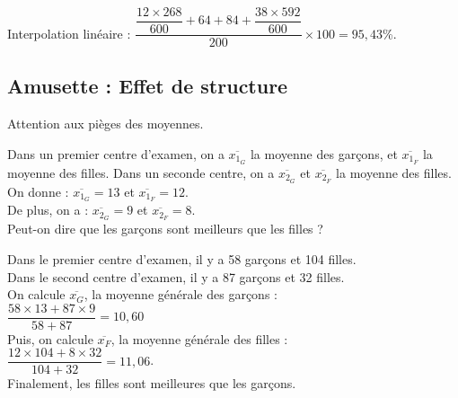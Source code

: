 Interpolation linéaire : $ \dfrac{\dfrac{12 \times 268}{600} + 64 + 84 + \dfrac{38 \times 592}{600}}{200} \times 100 = 95,43$\%. \\

\newpage

\subsection{Amusette : Effet de structure}

Attention aux pièges des moyennes.

Dans un premier centre d'examen, on a $\overline{x_{1_G}}$ la moyenne des garçons, et $\overline{x_{1_F}}$ la moyenne des filles. Dans un seconde centre, on a $\overline{x_{2_G}}$ et $\overline{x_{2_F}}$ la moyenne des filles. \\

On donne : $\overline{x_{1_G}} = 13$ et $\overline{x_{1_F}} = 12$. \\

De plus, on a : $\overline{x_{2_G}} = 9 $ et $\overline{x_{2_F}} = 8$. \\

Peut-on dire que les garçons sont meilleurs que les filles ?

Dans le premier centre d'examen, il y a 58 garçons et 104 filles. \\
Dans le second centre d'examen, il y a 87 garçons et 32 filles. \\

On calcule $\overline{x_G}$, la moyenne générale des garçons : \\

$\dfrac{58 \times 13 + 87 \times 9}{58 + 87} = 10,60 $ \\

Puis, on calcule $\overline{x_F}$, la moyenne générale des filles : \\

$ \dfrac{12 \times 104 + 8 \times 32 }{104 + 32} = 11,06 $. \\

Finalement, les filles sont meilleures que les garçons.
